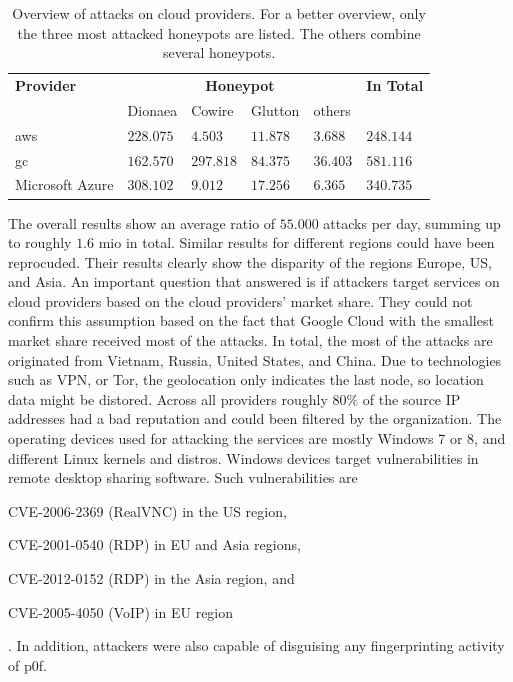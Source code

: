 \begin{table}
    \centering
    \caption[Overview of attacks on cloud providers]{Overview of attacks on cloud providers. For a better overview, only the three most attacked honeypots are listed. The others combine several honeypots.}
    \begin{tabular}{l|llll|l}
        \toprule
        \textbf{Provider} & \multicolumn{4}{c|}{\textbf{Honeypot}} & \textbf{In Total}                                   \\
                          & Dionaea                                & Cowire            & Glutton  & others   &           \\
        \hline
        \acl{aws}         & $228.075$                              & $4.503$           & $11.878$ & $3.688$  & $248.144$ \\
        \acl{gc}          & $162.570$                              & $297.818$         & $84.375$ & $36.403$ & $581.116$ \\
        Microsoft Azure   & $308.102$                              & $9.012$           & $17.256$ & $6.365$  & $340.735$ \\
        \bottomrule
    \end{tabular}
    \label{tab:overview-cloud-security}
\end{table}

The overall results show an average ratio of $55.000$ attacks per day, summing up to roughly $1.6$ mio in total.
Similar results for different regions could have been reprocuded.
Their results clearly show the disparity of the regions Europe, US, and Asia.
An important question that \citet{Kelly2021} answered is if attackers target services on cloud providers based on the cloud providers' market share.
They could not confirm this assumption based on the fact that Google Cloud with the smallest market share received most of the attacks.
In total, the most of the attacks are originated from Vietnam, Russia, United States, and China.
Due to technologies such as VPN, or Tor, the geolocation only indicates the last node, so location data might be distored.
Across all providers roughly $80\%$ of the source IP addresses had a bad reputation and could been filtered by the organization.
The operating devices used for attacking the services are mostly Windows 7 or 8, and different Linux kernels and distros.
Windows devices target vulnerabilities in remote desktop sharing software. Such vulnerabilities are
\begin{enumerate*}[label=(\roman*)]
    \item CVE-2006-2369\cite{CVE-2006-2369} (RealVNC) in the US region,
    \item CVE-2001-0540\cite{CVE-2001-0540} (RDP) in EU and Asia regions,
    \item CVE-2012-0152\cite{CVE-2012-0152} (RDP) in the Asia region, and
    \item CVE-2005-4050\cite{CVE-2005-4050} (VoIP) in EU region
\end{enumerate*}.
In addition, attackers were also capable of disguising any fingerprinting activity of p0f.

